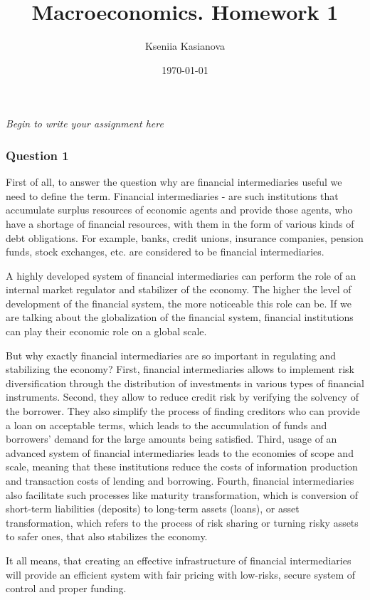 \documentclass[a4paper,12pt]{article} %
\author{Kseniia Kasianova}
\title{Macroeconomics. Homework 1}
\date{\today}
\newcommand{\latinword}[1]{\textsf{\itshape #1}}%
\begin{document}
{\color{blue} \latinword{Begin to write your assignment here}}

\noindent\makebox[\linewidth]{\rule{\textwidth}{0.4pt}}


\subsubsection*{Question 1} 


First of all, to answer the question why are financial intermediaries useful we need to define the term. Financial intermediaries - are such institutions that accumulate surplus resources of economic agents and provide those agents, who have a shortage of financial resources, with them in the form of various kinds of debt obligations.
For example, banks, credit unions, insurance companies, pension funds, stock exchanges, etc. are considered to be financial intermediaries.

A highly developed system of financial intermediaries can perform the role of an internal market regulator and stabilizer of the economy. The higher the level of development of the financial system, the more noticeable this role can be. If we are talking about the globalization of the financial system, financial institutions can play their economic role on a global scale.

But why exactly financial intermediaries are so important in regulating and stabilizing the economy? 
First, financial intermediaries allows to implement risk diversification through the distribution of investments in various types of financial instruments. 
Second, they allow to reduce  credit risk by verifying the solvency of the borrower. They also simplify the process of finding creditors who can provide a loan on acceptable terms, which leads to the accumulation of funds and borrowers' demand for the large amounts being satisfied. 
Third, usage of an advanced system of financial intermediaries leads to the economies of scope and scale, meaning that these institutions 
reduce the costs of information production and transaction costs of lending and borrowing. 
Fourth, financial intermediaries also facilitate such processes like maturity transformation, which is conversion of short-term liabilities (deposits) to long-term assets (loans), or asset transformation, which refers to the process of risk sharing or turning risky assets to safer ones, that also stabilizes the economy. 
 
 It all means, that creating an effective infrastructure of 
 financial intermediaries  will provide an efficient system with   fair pricing
with  low-risks, secure  system of control and proper funding.
 
\end{document}
